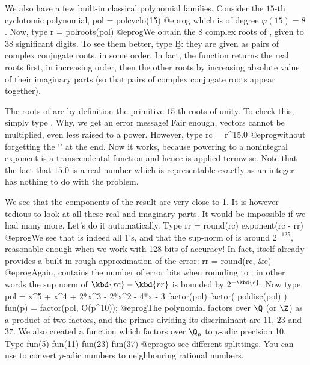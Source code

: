 We also have a few built-in classical polynomial families. Consider the
$15$-th cyclotomic polynomial,
\bprog
  pol = polcyclo(15)
@eprog\noindent
which is of degree $\varphi(15)=8$. Now, type
\bprog
  r = polroots(pol)
@eprog\noindent We obtain the 8 complex roots of , given to 38
significant digits. To see them better, type \b{B}: they are given as pairs
of complex conjugate roots, in some order. In fact, the
function  returns the real roots first, in increasing order,
then the other roots by increasing absolute value of their imaginary parts
(so that pairs of complex conjugate roots appear together).

The roots of  are by definition the primitive $15$-th roots of unity.
To check this, simply type . Why, we get an error message!
Fair enough, vectors cannot be multiplied, even less raised to a power.
However, type
\bprog
  rc = r^15.0
@eprog\noindent without forgetting the `' at the end. Now it works,
because powering to a nonintegral exponent is a transcendental function and
hence is applied termwise. Note that the fact that $15.0$ is a real number
which is representable exactly as an integer has nothing to do with the
problem.

We see that the components of the result are very close to 1. It is however
tedious to look at all these real and imaginary parts. It would be impossible
if we had many more. Let's do it automatically. Type
\bprog
  rr = round(rc)
  exponent(rc - rr)
@eprog\noindent We see that  is indeed all 1's, and that the
sup-norm of  is around $2^{-125}$, reasonable enough when we
work with 128 bits of accuracy! In fact,  itself already provides
a built-in rough approximation of the error:
\bprog
  rr = round(rc, &e)
@eprog\noindent Again,  contains the number of error bits when rounding
 to ; in other words the sup norm of $\kbd{rc} - \kbd{rr}$
is bounded by $2^{-\kbd{e}}$.
%
\smallskip
Now type
\bprog
  pol = x^5 + x^4 + 2*x^3 - 2*x^2 - 4*x - 3
  factor(pol)
  factor( poldisc(pol) )
  fun(p) = factor(pol, O(p^10));
@eprog\noindent The polynomial  factors over $\Q$ (or $\Z$) as a
product of two factors, and the primes dividing its discriminant are
$11$, $23$ and $37$. We also created a function  which factors
 over $\Q_p$ to $p$-adic precision 10. Type
\bprog
  fun(5)
  fun(11)
  fun(23)
  fun(37)
@eprog\noindent to see different splittings. You can use  to
convert $p$-adic numbers to neighbouring rational numbers.

